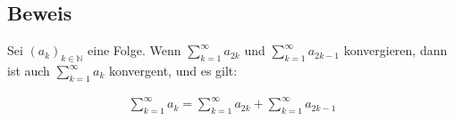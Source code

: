 \documentclass[fontsize=9pt,
               parskip=half-,
               DIV=14,
               listof=chapterentry,
               tocflat]{scrbook}
\begin{document}
\subsection{Beweis}

\begin{theorem*}
Sei $(a_{k})_{k\in \mathbb {N} }$ eine Folge. Wenn $\sum _{k=1}^{\infty }a_{2k}$ und $\sum _{k=1}^{\infty }a_{2k-1}$ konvergieren, dann ist auch $\sum _{k=1}^{\infty }a_{k}$ konvergent, und es gilt:

\begin{align*}
\sum _{k=1}^{\infty }a_{k}=\sum _{k=1}^{\infty }a_{2k}+\sum _{k=1}^{\infty }a_{2k-1}
\end{align*}

\end{theorem*}
\end{document}
